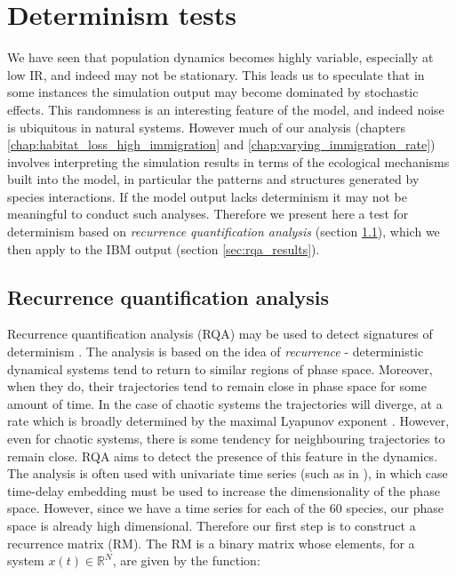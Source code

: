 \clearpage
\section{Determinism tests}
\label{sec:determinism}


We have seen that population dynamics becomes highly variable, especially at low IR, and indeed may not be stationary. This leads us to speculate that in some instances the simulation output may become dominated by stochastic effects. This randomness is an interesting feature of the model, and indeed noise is ubiquitous in natural systems. However much of our analysis (chapters \ref{chap:habitat_loss_high_immigration} and \ref{chap:varying_immigration_rate}) involves interpreting the simulation results in terms of the ecological mechanisms built into the model, in particular the patterns and structures generated by species interactions. If the model output lacks determinism it may not be meaningful to conduct such analyses. Therefore we present here a test for determinism based on \emph{recurrence quantification analysis} (section \ref{sec:rqa}), which we then apply to the IBM output (section \ref{sec:rqa_results}).

\subsection{Recurrence quantification analysis}
\label{sec:rqa}      

Recurrence quantification analysis (RQA) may be used to detect signatures of determinism \cite{marwan2007recurrence,aparicio2008detecting,saul09phd}. The analysis is based on the idea of \emph{recurrence} - deterministic dynamical systems tend to return to similar regions of phase space. Moreover, when they do, their trajectories tend to remain close in phase space for some amount of time. In the case of chaotic systems the trajectories will diverge, at a rate which is broadly determined by the maximal Lyapunov exponent \cite{saul09phd}. However, even for chaotic systems, there is some tendency for neighbouring trajectories to remain close. RQA aims to detect the presence of this feature in the dynamics. The analysis is often used with univariate time series (such as in \cite{saul09phd}), in which case time-delay embedding must be used to increase the dimensionality of the phase space. However, since we have a time series for each of the 60 species, our phase space is already high dimensional. Therefore our first step is to construct a recurrence matrix (RM). The RM is a binary matrix whose elements, for a system $x(t) \in \mathbb{R}^N$, are given by the function:

